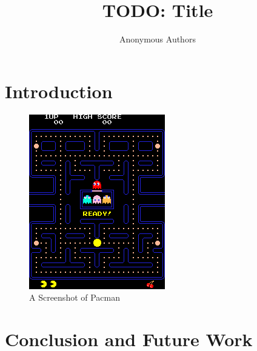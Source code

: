 \documentclass{article}
\title{TODO: Title}
\author{Anonymous Authors}
\date{}
\begin{document}
\maketitle

\section{Introduction}

\begin{figure}[ht]
  \centering
  \includegraphics{images/pacman.png}
  \caption{A Screenshot of Pacman}
  \label{fig:pacman-screenshot}
\end{figure}

\section{Conclusion and Future Work}
\end{document}

